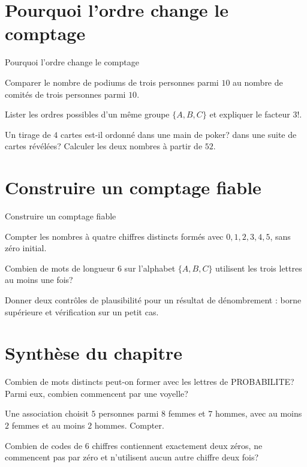 \section{Pourquoi l'ordre change le comptage}
\label{workbook:section:07.08}
\begin{exerciseblock}{Pourquoi l'ordre change le comptage}
\item Comparer le nombre de podiums de trois personnes parmi $10$ au nombre de comités de trois personnes parmi $10$.
\item Lister les ordres possibles d'un même groupe $\{A,B,C\}$ et expliquer le facteur $3!$.
\item Un tirage de $4$ cartes est-il ordonné dans une main de poker? dans une suite de cartes révélées? Calculer les deux nombres à partir de $52$.
\end{exerciseblock}
\section{Construire un comptage fiable}
\label{workbook:section:07.09}
\begin{exerciseblock}{Construire un comptage fiable}
\item Compter les nombres à quatre chiffres distincts formés avec $0,1,2,3,4,5$, sans zéro initial.
\item Combien de mots de longueur $6$ sur l'alphabet $\{A,B,C\}$ utilisent les trois lettres au moins une fois?
\item Donner deux contrôles de plausibilité pour un résultat de dénombrement : borne supérieure et vérification sur un petit cas.
\end{exerciseblock}
\section*{Synthèse du chapitre}
\begin{synthesisbox}
\item Combien de mots distincts peut-on former avec les lettres de PROBABILITE? Parmi eux, combien commencent par une voyelle?
\item Une association choisit $5$ personnes parmi $8$ femmes et $7$ hommes, avec au moins $2$ femmes et au moins $2$ hommes. Compter.
\item Combien de codes de $6$ chiffres contiennent exactement deux zéros, ne commencent pas par zéro et n'utilisent aucun autre chiffre deux fois?
\end{synthesisbox}
